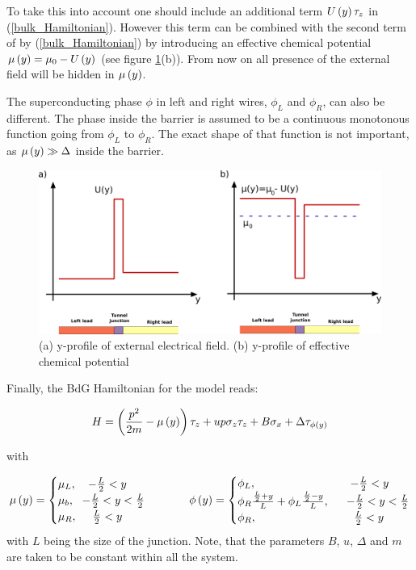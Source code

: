 To take this into account one should include an additional term $ U \left(y\right)\tau_z $ in (\ref{bulk_Hamiltonian}). However this term can be combined with the second term of  by (\ref{bulk_Hamiltonian}) by introducing an effective chemical potential $ \mu \left(y\right) = \mu_0 - U\left(y\right)  $ (see figure \ref{fig:chemandextpotentials}(b)). From now on all presence of  the external field will be hidden in $ \mu\left(y\right) $.

The superconducting phase $ \phi $ in left and right wires, $ \phi_L $ and $ \phi_R $, can also be different. The phase inside the barrier is assumed to be a continuous monotonous function going from $ \phi_L $ to $ \phi_R $. The exact shape of that function is not important, as $ \mu\left(y\right) \gg \Delta$ inside the   
barrier.



\begin{figure}[H]
	\centering
	\includegraphics[width=0.8\linewidth]{images/chem_and_ext_potentials}
	\caption{(a) y-profile of external electrical field.  (b) y-profile of effective chemical potential}
	\label{fig:chemandextpotentials}
\end{figure}


Finally, the BdG Hamiltonian for the model reads:

\begin{equation}
\label{full_hamiltonian}
H
=
\left(
	\frac{p^2}{2m}
	-\mu\left(y\right)
\right)\tau_z
+
u p \sigma_z \tau_z
+
B\sigma_x	
+
\Delta\tau_{\phi\left(y\right)}
\end{equation}

with

\begin{equation}
\label{full_hamiltonian_suppl}
	\mu\left(y\right)
	=
	\begin{cases}
		\mu_L,~~~  -\frac{L}{2}<y\\
		\mu_b,~~ -\frac{L}{2} <y <\frac{L}{2}\\
		\mu_R, ~~~~ \frac{L}{2}< y  
	\end{cases}
	~~~~~~~~
	\phi\left(y\right)
	=
	\begin{cases}
		\phi_L,&~~~  -\frac{L}{2}<y\\
		\phi_R
		\frac{\frac{L}{2}+y}{L}
		+
		\phi_L
		\frac{\frac{L}{2}-y}{L},
		&~~ -\frac{L}{2} <y <\frac{L}{2}\\
		\phi_R, &~~~~ \frac{L}{2}< y 
	\end{cases}
\end{equation}
with $ L $ being the size of the junction. Note, that the parameters $ B $, $ u $, $ \Delta $ and $ m $ are taken to be constant within all the system.
 
